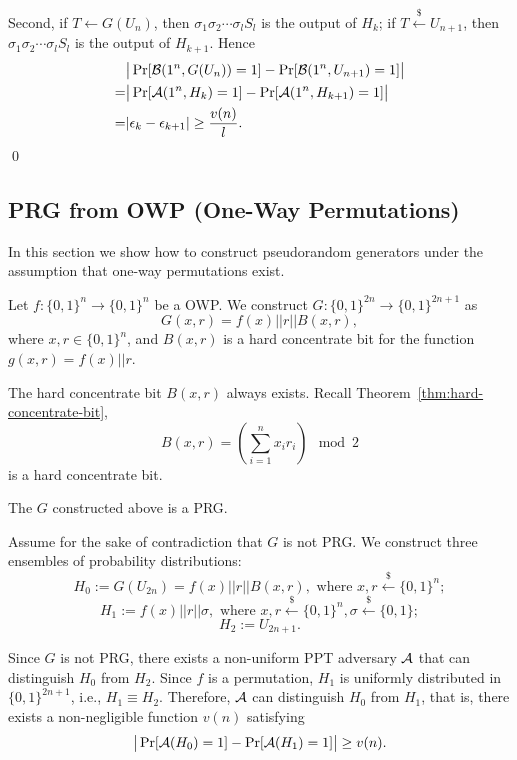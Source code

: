 \documentclass[12pt]{tufte-book}
\begin{document}
Second, if $T\gets G(U_n)$, then $\sigma_1 \sigma_2 \cdots \sigma_l S_l$ is the output of  $H_{k}$; if $T \stackrel{\$}\leftarrow U_{n+1}$, then $\sigma_1 \sigma_2 \cdots \sigma_l S_l$ is the output of $H_{k+1}$.
Hence
\begin{align*}
&\big|\Pr[\mathcal{B}(1^n, G(U_n)) = 1] - \Pr[\mathcal{B}(1^n, U_{n+1}) = 1]\big|\\
=& \big|\Pr[\mathcal{A}(1^n,H_k) = 1] - \Pr[\mathcal{A}(1^n,H_{k+1}) = 1]\big|\\
=&
|\epsilon_{k} - \epsilon_{k+1}| \geq \frac{v(n)}{l}.
\end{align*}
\qed

\subsection{PRG from OWP (One-Way Permutations)}
In this section we show how to construct pseudorandom generators under the assumption that one-way permutations exist.

\begin{construction}
Let $f: \{0, 1\}^n \rightarrow \{0, 1\}^n$ be a OWP. We construct $G: \{0, 1\}^{2n} \rightarrow \{0, 1\}^{2n+1}$ as
\[
G(x, r) = f(x) || r || B(x, r),
\]
where $x, r \in \{0, 1\}^n$, and $B(x, r)$ is a hard concentrate bit for the function $g(x,r) = f(x) || r$.
\end{construction}

\begin{remark}
The hard concentrate bit $B(x,r)$ always exists. Recall Theorem~\ref{thm:hard-concentrate-bit},
\[B(x,r) = \left(\sum_{i=1}^n x_i r_i\right)\mod 2\]
is a hard concentrate bit.
\end{remark}

\begin{theorem}
The $G$ constructed above is a PRG.
\end{theorem}

\proof
Assume for the sake of contradiction that $G$ is not PRG.
We construct three ensembles of probability distributions:
\[H_0 := G(U_{2n}) = f(x) || r || B(x, r), \text{ where } x, r \xleftarrow{\$} \{0, 1\}^n;\]
\[H_1 := f(x) || r || \sigma, \text{ where } x, r \xleftarrow{\$} \{0, 1\}^n, \sigma \xleftarrow{\$} \{0, 1\};\]
\[H_2 := U_{2n+1}.\]

Since $G$ is not PRG, there exists a non-uniform PPT adversary $\mathcal{A}$ that can distinguish $H_0$ from $H_2$.
Since $f$ is a permutation, $H_1$ is uniformly distributed in $\{0, 1\}^{2n+1}$, i.e., $H_1 \equiv H_2$.
Therefore, $\mathcal{A}$ can distinguish $H_0$ from $H_1$,
that is, there exists a non-negligible function $v(n)$ satisfying
\[
\big| \Pr[\mathcal{A}(H_0)=1] - \Pr[\mathcal{A}(H_1)=1] \big| \geq v(n).
\]
\end{document}
